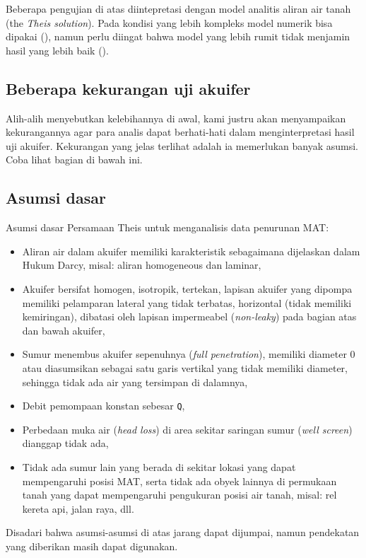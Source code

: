Beberapa pengujian di atas diintepretasi dengan model analitis  aliran air tanah (the \textit{Theis solution}). Pada kondisi yang lebih kompleks model numerik bisa dipakai (\cite{lebbe1995validation}), namun perlu diingat bahwa model yang lebih rumit tidak menjamin hasil yang lebih baik (\cite{Johnson_2001}\cite{Rushton_1976}\cite{Rathod_1984}\cite{2011}\cite{Lebbe_1999}\cite{Lebbe_1999}). 

\subsection{Beberapa kekurangan uji akuifer}

Alih-alih menyebutkan kelebihannya di awal, kami justru akan menyampaikan kekurangannya agar para analis dapat berhati-hati dalam menginterpretasi hasil uji akuifer. Kekurangan yang jelas terlihat adalah ia memerlukan banyak asumsi. Coba lihat bagian di bawah ini.


\subsection{Asumsi dasar}

Asumsi dasar Persamaan Theis untuk menganalisis data penurunan MAT:

\begin{itemize}
\item Aliran air dalam akuifer memiliki karakteristik sebagaimana dijelaskan dalam Hukum Darcy, misal: aliran homogeneous dan laminar, 
\item Akuifer bersifat homogen, isotropik, tertekan, lapisan akuifer yang dipompa memiliki pelamparan lateral yang tidak terbatas, horizontal (tidak memiliki kemiringan), dibatasi oleh lapisan impermeabel (\textit{non-leaky}) pada bagian atas dan bawah akuifer,
\item Sumur menembus akuifer sepenuhnya (\textit{full penetration}), memiliki diameter 0 atau diasumsikan sebagai satu garis vertikal yang tidak memiliki diameter, sehingga tidak ada air yang tersimpan di dalamnya,
\item Debit pemompaan konstan sebesar \verb|Q|,
\item Perbedaan muka air (\textit{head loss}) di area sekitar saringan sumur (\textit{well screen}) dianggap tidak ada,
\item Tidak ada sumur lain yang berada di sekitar lokasi yang dapat mempengaruhi posisi MAT, serta tidak ada obyek lainnya di permukaan tanah yang dapat mempengaruhi pengukuran posisi air tanah, misal: rel kereta api, jalan raya, dll.
\end{itemize}

Disadari bahwa asumsi-asumsi di atas jarang dapat dijumpai, namun pendekatan yang diberikan masih dapat digunakan. 

